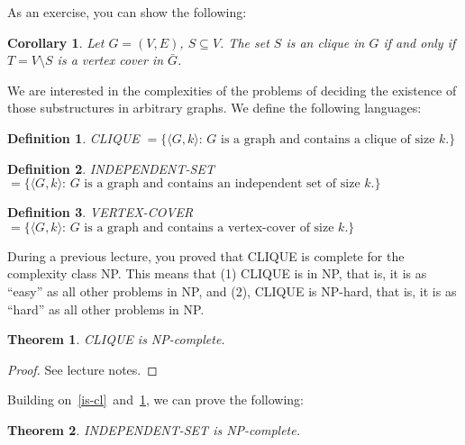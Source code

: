 \documentclass{article}
\newcommand{\theoremname}{Theorem}
\newcommand{\corollaryname}{Corollary}
\newcommand{\definitionname}{Definition}
\newtheorem{theorem}{\theoremname}
\newtheorem{corollary}{\corollaryname}
\newtheorem{definition}{\definitionname}
\newcommand{\st}{\colon\,}
\begin{document}
As an exercise, you can show the following:
\begin{corollary}\label{vc-cl}
  Let $G = (V,E)$, $S \subseteq V$. The set $S$ is an clique in $G$ if
  and only if $T = V \setminus S$ is a vertex cover in $\bar{G}$.
\end{corollary}

We are interested in the complexities of the problems of deciding the existence
of those substructures in arbitrary graphs. We define the following languages:
\begin{definition}
  CLIQUE $= \{\langle G,k \rangle \st \text{$G$ is a graph and contains a clique of size $k$.} \}$
\end{definition}

\begin{definition}
  INDEPENDENT-SET $= \{\langle G,k \rangle \st \text{$G$ is a graph and contains an independent set of size $k$.} \}$
\end{definition}

\begin{definition}
  VERTEX-COVER $= \{\langle G,k \rangle \st \text{$G$ is a graph and contains a vertex-cover of size $k$.} \}$
\end{definition}

During a previous lecture, you proved that CLIQUE is complete for the
complexity class NP. This means that (1) CLIQUE is in NP, that is, it is as
``easy'' as all other problems in NP, and (2), CLIQUE is NP-hard,
that is, it is as ``hard'' as all other problems in NP.
\begin{theorem}\label{cl:npc}
CLIQUE is NP-complete.
\end{theorem}
\begin{proof}
  See lecture notes.
\end{proof}

Building on~\ref{is-cl}~and~\ref{cl:npc}, we can prove the following:
\begin{theorem}\label{is:npc}
INDEPENDENT-SET is NP-complete.
\end{theorem}
\end{document}
